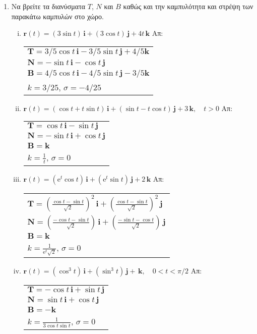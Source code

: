 \documentclass[a4paper,table]{report}
\begin{document}
\begin{enumerate}
  \item Να βρείτε τα διανύσματα $ T $, $N$ και $B$ καθώς και την καμπυλότητα και στρέψη  
    των παρακάτω καμπυλών στο χώρο.
    \begin{enumerate}[i)]
      \item $ \mathbf{r}(t)=(3 \sin{t})\, \mathbf{i} + (3 \cos{t})\, \mathbf{j} + 4t 
        \, \mathbf{k} $ 
        \hfill Απ: \begin{tabular}{l}
          $ \mathbf{T}=  3/5 \cos{t}\,\mathbf{i} - 3/5 \sin{t} \,\mathbf{j} + 4/5 
          \mathbf{k} $ \\
          $ \mathbf{N}=  - \sin{t}\,\mathbf{i} - \cos{t}\,\mathbf{j} $ \\
          $ \mathbf{Β}=  4/5 \cos{t}\,\mathbf{i} - 4/5\sin{t}\,\mathbf{j}-3/5 
          \mathbf{k} $ \\
          $ k = 3/25 $, $ \sigma = -4/25 $
        \end{tabular} 
      \item $ \mathbf{r}(t)=(\cos{t} + t \sin{t})\, \mathbf{i} + (\sin{t} -t \cos{t})
        \, \mathbf{j} + 3 \, \mathbf{k}, \quad t>0 $
        \hfill Απ: \begin{tabular}{l}
          $ \mathbf{T}=  \cos{t}\,\mathbf{i} - \sin{t}\,\mathbf{j} $ \\
          $ \mathbf{N}=  - \sin{t}\,\mathbf{i} + \cos{t}\,\mathbf{j} $ \\
          $ \mathbf{B}= \mathbf{k} $ \\
          $ k = \frac{1}{t} $, $ \sigma = 0 $  
        \end{tabular} 
      \item $ \mathbf{r}(t)=(\mathrm{e}^{t} \cos{t})\, \mathbf{i} + (\mathrm{e}^{t}
        \sin{t})\, \mathbf{j} + 2 \, \mathbf{k} $ 
        \hfill Απ: \begin{tabular}{l}
          $ \mathbf{T}=  (\frac{\cos{t} - \sin{t}}{\sqrt{2}} )^{2}\,\mathbf{i} +
          (\frac{\cos{t} - \sin{t}}{\sqrt{2}} )^{2}\,\mathbf{j}$ \\
          $ \mathbf{N}=  (\frac{- \cos{t} - \sin{t}}{\sqrt{2}})\,\mathbf{i} +
          (\frac{- \sin{t} - \cos{t}}{\sqrt{2}})\,\mathbf{j}$ \\
          $ \mathbf{B}= \mathbf{k} $ \\
          $ k = \frac{1}{\mathrm{e}^{t} \sqrt{2}} $, $ \sigma = 0 $ 
        \end{tabular} 
      \item $ \mathbf{r}(t)=(\cos^{3}{t})\, \mathbf{i} + (\sin^{3}{t})\, \mathbf{j} + \,
        \mathbf{k} , \quad 0<t< \pi /2$ 
        \hfill Απ: \begin{tabular}{l}
          $ \mathbf{T}=  - \cos{t}\,\mathbf{i} + \sin{t}\,\mathbf{j}$ \\
          $ \mathbf{N}=  \sin{t}\,\mathbf{i} + \cos{t}\,\mathbf{j} $ \\
          $ \mathbf{B}= -\mathbf{k} $ \\
          $ k = \frac{1}{3 \cos{t} \sin{t}} $, $ \sigma = 0 $ 
        \end{tabular} 
    \end{enumerate}
    

\end{enumerate}
\end{document}
